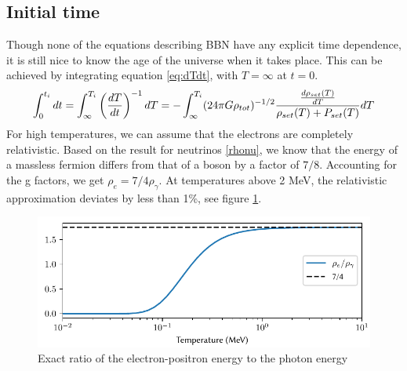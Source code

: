 \subsection{Initial time}
\label{sec:t_ini}
Though none of the equations describing BBN have any explicit time dependence, it is still nice to know the age of the universe when it takes place. This can be achieved by integrating equation \eqref{eq:dTdt}, with $T=\infty$ at $t=0$.
\begin{align}
    \int_{0}^{t_i}dt=\int_{\infty}^{T_i}\left(\frac{dT}{dt}\right)^{-1}dT=-\int_{\infty}^{T_i}(24\pi G\rho_{tot})^{-1/2}\frac{\frac{d\rho_{set}(T)}{dT}}{\rho_{set}(T) + P_{set}(T)}dT
    \label{eq:ti_integral}
\end{align}
For high temperatures, we can assume that the electrons are completely relativistic. Based on the result for neutrinos \eqref{rhonu}, we know that the energy of a massless fermion differs from that of a boson by a factor of $7/8$. Accounting for the g factors, we get $\rho_e=7/4 \rho_\gamma$. At temperatures above 2 MeV, the relativistic approximation deviates by less than 1\%, see figure \ref{fig:rhoegammaT}.
\begin{figure}[ht]
    \includegraphics[width=5.1in]{figures/rhoegammaT.pdf}
    \caption{Exact ratio of the electron-positron energy to the photon energy}
    \label{fig:rhoegammaT}
\end{figure}

